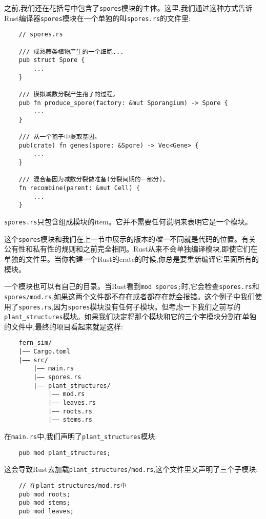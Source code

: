 之前,我们还在花括号中包含了\texttt{spores}模块的主体。这里,我们通过这种方式告诉Rust编译器\texttt{spores}模块在一个单独的叫\texttt{spores.rs}的文件里:
\begin{verbatim}
    // spores.rs

    /// 成熟蕨类植物产生的一个细胞...
    pub struct Spore {
        ...
    }

    /// 模拟减数分裂产生孢子的过程。
    pub fn produce_spore(factory: &mut Sporangium) -> Spore {
        ...
    }

    /// 从一个孢子中提取基因。
    pub(crate) fn genes(spore: &Spore) -> Vec<Gene> {
        ...
    }

    /// 混合基因为减数分裂做准备(分裂间期的一部分)。
    fn recombine(parent: &mut Cell) {
        ...
    }
\end{verbatim}

\texttt{spores.rs}只包含组成模块的item。它并不需要任何说明来表明它是一个模块。

这个\texttt{spores}模块和我们在上一节中展示的版本的\emph{唯一}不同就是代码的位置。有关公有性和私有性的规则和之前完全相同。Rust从来不会单独编译模块,即使它们在单独的文件里。当你构建一个Rust的crate的时候,你总是要重新编译它里面所有的模块。

一个模块也可以有自己的目录。当Rust看到\texttt{mod spores;}时,它会检查\texttt{spores.rs}和\\
\texttt{spores/mod.rs},如果这两个文件都不存在或者都存在就会报错。这个例子中我们使用了\texttt{spores.rs},因为\texttt{spores}模块没有任何子模块。但考虑一下我们之前写的\texttt{plant\_structures}模块。如果我们决定将那个模块和它的三个字模块分割在单独的文件中,最终的项目看起来就是这样:
\begin{verbatim}
    fern_sim/
    |—— Cargo.toml
    |—— src/
        |—— main.rs
        |—— spores.rs
        |—— plant_structures/
            |—— mod.rs
            |—— leaves.rs
            |—— roots.rs
            |—— stems.rs
\end{verbatim}

在\texttt{main.rs}中,我们声明了\texttt{plant\_structures}模块:
\begin{verbatim}
    pub mod plant_structures;
\end{verbatim}

这会导致Rust去加载\texttt{plant\_structures/mod.rs},这个文件里又声明了三个子模块:
\begin{verbatim}
    // 在plant_structures/mod.rs中
    pub mod roots;
    pub mod stems;
    pub mod leaves;
\end{verbatim}

